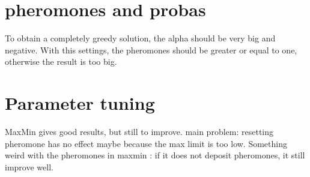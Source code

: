 \documentclass{article}
\begin{document}
\section{pheromones and probas}

To obtain a completely greedy solution, the alpha should be very big and negative.
With this settings, the pheromones should be greater or equal to one, otherwise the result is too big.

\section{Parameter tuning}

MaxMin gives good results, but still to improve.
main problem: resetting pheromone has no effect maybe because the max limit is too low.
Something weird with the pheromones in maxmin : if it does not deposit pheromones, it still improve well.
\end{document}
